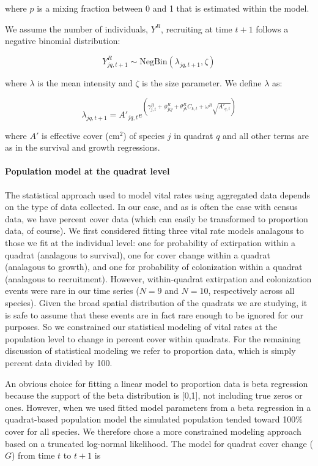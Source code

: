 \documentclass[12pt,]{article}
\begin{document}
where $p$ is a mixing fraction between 0 and 1 that is estimated within
the model.

We assume the number of individuals, $Y^{R}$, recruiting at time $t+1$
follows a negative binomial distribution:

\begin{equation}
Y^{R}_{jq,t+1} \sim \text{NegBin}(\lambda_{jq,t+1},\zeta)
\end{equation}

where $\lambda$ is the mean intensity and $\zeta$ is the size parameter.
We define $\lambda$ as:

\begin{equation}
\lambda_{jq,t+1} = A'_{jq,t}e^{(\gamma^{R}_{j,t} + \phi^{R}_{jQ} + \theta^{R}_{jk}C_{k,t} + \omega^{R}\sqrt{A'_{q,t}})}
\end{equation}

where $A'$ is effective cover ($\text{cm}^2$) of species $j$ in quadrat
$q$ and all other terms are as in the survival and growth regressions.

\paragraph{Population model at the quadrat
level}\label{population-model-at-the-quadrat-level}

The statistical approach used to model vital rates using aggregated data
depends on the type of data collected. In our case, and as is often the
case with census data, we have percent cover data (which can easily be
transformed to proportion data, of course). We first considered fitting
three vital rate models analagous to those we fit at the individual
level: one for probability of extirpation within a quadrat (analagous to
survival), one for cover change within a quadrat (analagous to growth),
and one for probability of colonization within a quadrat (analagous to
recruitment). However, within-quadrat extirpation and colonization
events were rare in our time series ($N=9$ and $N=10$, respectively
across all species). Given the broad spatial distribution of the
quadrats we are studying, it is safe to assume that these events are in
fact rare enough to be ignored for our purposes. So we constrained our
statistical modeling of vital rates at the population level to change in
percent cover within quadrats. For the remaining discussion of
statistical modeling we refer to proportion data, which is simply
percent data divided by 100.

An obvious choice for fitting a linear model to proportion data is beta
regression because the support of the beta distribution is {[}0,1{]},
not including true zeros or ones. However, when we used fitted model
parameters from a beta regression in a quadrat-based population model
the simulated population tended toward 100\% cover for all species. We
therefore chose a more constrained modeling approach based on a
truncated log-normal likelihood. The model for quadrat cover change
($G$) from time $t$ to $t+1$ is
\end{document}
